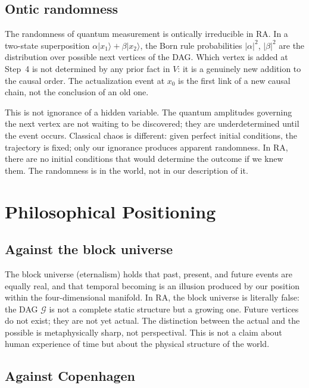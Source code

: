 \documentclass[11pt,twocolumn]{article}
\theoremstyle{plain}
\theoremstyle{remark}
\newcommand{\DAG}{\mathcal{G}}
\begin{document}
\subsection{Ontic randomness}

The randomness of quantum measurement is ontically irreducible in RA.
In a two-state superposition $\alpha|x_1\rangle + \beta|x_2\rangle$,
the Born rule probabilities $|\alpha|^2$, $|\beta|^2$ are the
distribution over possible next vertices of the DAG.
Which vertex is added at Step~4 is not determined by any prior
fact in $V$: it is a genuinely new addition to the causal order.
The actualization event at $x_0$ is the first link of a new causal
chain, not the conclusion of an old one.

This is not ignorance of a hidden variable.
The quantum amplitudes governing the next vertex are not waiting to
be discovered; they are underdetermined until the event occurs.
Classical chaos is different: given perfect initial conditions,
the trajectory is fixed; only our ignorance produces apparent
randomness.
In RA, there are no initial conditions that would determine the
outcome if we knew them.
The randomness is in the world, not in our description of it.

\section{Philosophical Positioning}
\label{sec:philosophy}

\subsection{Against the block universe}

The block universe (eternalism) holds that past, present, and future
events are equally real, and that temporal becoming is an illusion
produced by our position within the four-dimensional manifold.
In RA, the block universe is literally false: the DAG $\DAG$ is
not a complete static structure but a growing one.
Future vertices do not exist; they are not yet actual.
The distinction between the actual and the possible is metaphysically
sharp, not perspectival.
This is not a claim about human experience of time but about the
physical structure of the world.

\subsection{Against Copenhagen}
\end{document}
